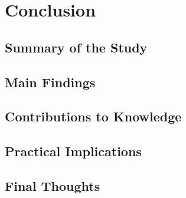 \chapter{Conclusion}
\section{Summary of the Study}


\section{Main Findings}

\section{Contributions to Knowledge}


\section{Practical Implications}


\section{Final Thoughts}
